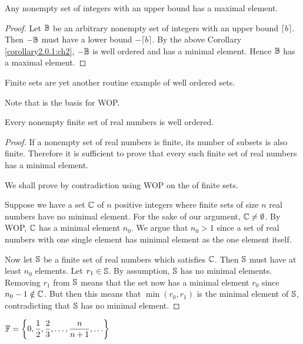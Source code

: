 \begin{cor}
    Any nonempty set of integers with an upper bound has a maximal element.
\end{cor}

\begin{proof} \label{corollary2.0.2:ch2}
    Let $\mathbb{B}$ be an arbitrary nonempty set of integers with an upper
    bound $\lceil b \rceil$. Then $-\mathbb{B}$ must have a lower bound $-\lceil b \rceil$.
    By the above Corollary \ref{corollary2.0.1:ch2}, $-\mathbb{B}$ is well ordered and has
    a minimal element. Hence $\mathbb{B}$ has a maximal element.
\end{proof}

Finite sets are yet another routine example of well ordered sets.

\begin{ab}
    Note that  is the basis for WOP.
\end{ab}

\begin{lemNotes}
    Every nonempty finite set of real numbers is well ordered.
\end{lemNotes}

\begin{proof}
    If a nonempty set of real numbers is finite, its number of subsets is also finite.
    Therefore it is sufficient to prove that every such finite set of real numbers has a minimal element.

    We shall prove by contradiction using WOP on the  of finite sets.

    Suppose we have a set $\mathbb{C}$ of $n$ positive integers where finite
    sets of size $n$ real numbers have no minimal element. For the sake of our argument,
    $\mathbb{C} \neq \emptyset$. By WOP, $\mathbb{C}$ has a minimal element $n_0$. We argue
    that $n_0 > 1$ since a set of real numbers with one single element has
    minimal element as the one element itself.

    Now let $\mathbb{S}$ be a finite set of real numbers which satisfies
    $\mathbb{C}$. Then $\mathbb{S}$ must have at least $n_0$ elements. Let $r_1 \in \mathbb{S}$.
    By assumption, $\mathbb{S}$ has no minimal elements. Removing $r_1$ from $\mathbb{S}$
    means that the set now has a minimal element $r_0$ since $n_0 - 1 \notin \mathbb{C}$.
    But then this means that $\min(r_0, r_1)$ is the minimal element of $\mathbb{S}$,
    contradicting that $\mathbb{S}$ has no minimal element.
\end{proof}

$\mathbb{F} = \left\{ 0, \dfrac{1}{2}, \dfrac{2}{3}, \ldots, \dfrac{n}{n + 1}, \ldots \right\}$

